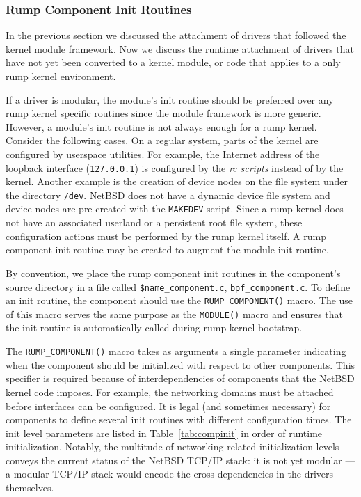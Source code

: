 \subsubsection{Rump Component Init Routines}

In the previous section we discussed the attachment of drivers that
followed the kernel module framework.  Now we discuss the runtime
attachment of drivers that have not yet been converted to a kernel
module, or code that applies to a only rump kernel environment.

If a driver is modular, the module's init routine should be preferred
over any rump kernel specific routines since the module framework is more generic.
However, a module's init routine is not always enough for a rump
kernel.  Consider the following cases.  On a regular system, parts of
the kernel are configured by userspace utilities.  For example,
the Internet address of the loopback interface (\texttt{127.0.0.1}) is configured by the
\textit{rc scripts} instead of by the kernel.  Another example is the creation
of device nodes on the file system under the directory \texttt{/dev}.  NetBSD does
not have a dynamic device file system and device nodes are pre-created
with the \texttt{MAKEDEV} script.  Since a rump kernel does not
have an associated userland or a persistent root file system, these
configuration actions must be performed by the rump kernel itself.
A rump component init routine may be created to augment the
module init routine.

By convention, we place the rump component init routines in the
component's source directory in a file called \verb+$name_component.c+,
\eg \verb+bpf_component.c+.
To define an init routine,  the component should use the
\verb+RUMP_COMPONENT()+ macro.  The use of this macro serves the
same purpose as the \verb+MODULE()+ macro and ensures that the init
routine is automatically called during rump kernel bootstrap.

The \verb+RUMP_COMPONENT()+ macro takes as arguments a single
parameter indicating when the component should be initialized
with respect to other components.
This specifier is required because of interdependencies of components
that the NetBSD kernel code imposes.  For example, the networking
domains must be attached before interfaces can be configured.  It
is legal (and sometimes necessary) for components to define several init
routines with different configuration times.
The init level parameters are listed in
Table~\ref{tab:compinit} in order of runtime initialization.  Notably, the
multitude of networking-related initialization levels conveys the
current status of the NetBSD TCP/IP stack: it is not yet modular --- a
modular TCP/IP stack would encode the cross-dependencies in the
drivers themselves.

